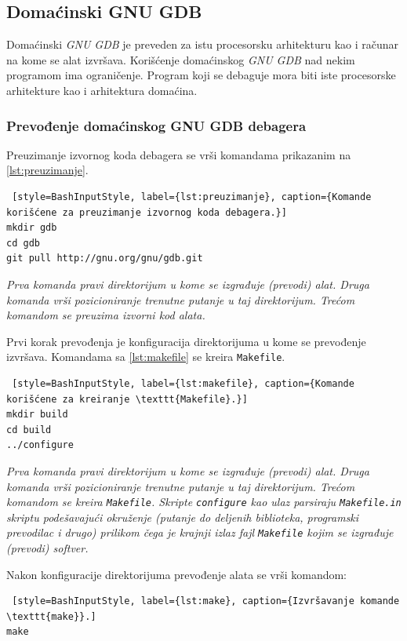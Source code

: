 \documentclass[12pt,oneside]{memoir}
\begin{document}
\subsection{Domaćinski GNU GDB}

Domaćinski \emph{GNU GDB} je preveden za istu procesorsku arhitekturu kao i računar na kome se alat izvršava. Korišćenje domaćinskog \emph{GNU GDB} nad nekim programom ima ograničenje. Program koji se debaguje mora biti iste procesorske arhitekture kao i arhitektura domaćina.

\subsubsection{Prevođenje domaćinskog GNU GDB debagera}

Preuzimanje izvornog koda debagera se vrši komandama prikazanim na \ref{lst:preuzimanje}.
\begin{lstlisting} [style=BashInputStyle, label={lst:preuzimanje}, caption={Komande korišćene za preuzimanje izvornog koda debagera.}]
mkdir gdb
cd gdb
git pull http://gnu.org/gnu/gdb.git

\end{lstlisting}

\emph{ Prva komanda pravi direktorijum u kome se izgrađuje (prevodi) alat. Druga komanda vrši pozicioniranje trenutne putanje u taj direktorijum. Trećom komandom se preuzima izvorni kod alata.}\newpage

Prvi korak prevođenja je konfiguracija direktorijuma u kome se prevođenje izvršava. Komandama sa \ref{lst:makefile} se kreira \texttt{Makefile}.
\begin{lstlisting} [style=BashInputStyle, label={lst:makefile}, caption={Komande korišćene za kreiranje \texttt{Makefile}.}]
mkdir build
cd build
../configure

\end{lstlisting}
\emph{Prva komanda pravi direktorijum u kome se izgrađuje (prevodi) alat. Druga komanda vrši pozicioniranje trenutne putanje u taj direktorijum. Trećom komandom se kreira \texttt{Makefile}. Skripte \texttt{configure} kao ulaz parsiraju \texttt{Makefile.in} skriptu podešavajući okruženje (putanje do deljenih biblioteka, programski prevodilac i drugo) prilikom čega je krajnji izlaz fajl \texttt{Makefile} kojim se izgrađuje (prevodi) softver.}

Nakon konfiguracije direktorijuma prevođenje alata se vrši komandom:
\begin{lstlisting} [style=BashInputStyle, label={lst:make}, caption={Izvršavanje komande \texttt{make}}.]
make
\end{lstlisting}
\end{document}
